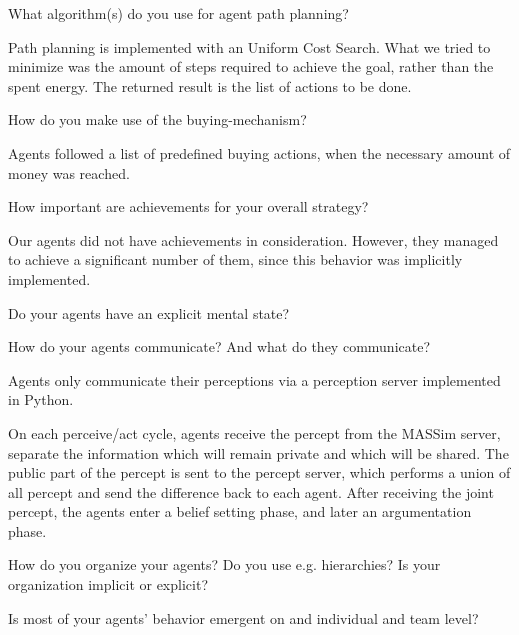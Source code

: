 \begin{question}
What algorithm(s) do you use for agent path planning?  
\end{question}

Path planning is
implemented with an Uniform Cost Search. What we tried to minimize was the
amount of steps required to achieve the goal, rather than the spent energy.
The returned result is the list of actions to be done.

\begin{question}
How do you make use of the buying-mechanism?  
\end{question}

Agents followed a list of
predefined buying actions, when the necessary amount of money was reached.

\begin{question}
How important are achievements for your overall strategy?  
\end{question}

Our agents did
not have achievements in consideration. However, they managed to achieve a
significant number of them, since this behavior was implicitly implemented.

\begin{question}
Do your agents have an explicit mental state?
\end{question}


\begin{question}
How do your agents communicate? And what do they communicate?  
\end{question}

Agents only
communicate their perceptions via a perception server implemented in Python.

On each perceive/act cycle, agents receive the percept from the
MASSim server, separate the information which will remain private and which
will be shared.  The public part of the percept is sent to the percept server,
which performs a union of all percept and send the difference back to each
agent. After receiving the joint percept, the agents enter a belief setting
phase, and later an argumentation phase.


\begin{question}
How do you organize your agents? Do you use e.g. hierarchies? Is your
organization implicit or explicit?
\end{question}


\begin{question}
Is most of your agents’ behavior emergent on and individual and team
level?
\end{question}

